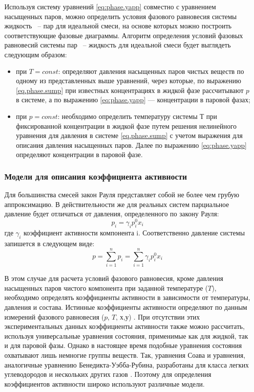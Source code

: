 Используя систему уравнений \eqref{eq:phase.yapp} совместно с уравнением насыщенных паров, можно определить условия фазового равновесия системы жидкость ~-- пар для идеальной смеси, на основе которых можно построить соответствующие фазовые диаграммы. 
Алгоритм определения условий фазовых равновесий системы пар ~-- жидкость для идеальной смеси будет выглядеть следующим образом:
\begin{itemize}
	\item при $T = const$: определяют давления насыщенных паров чистых веществ по одному из представленных выше уравнений, через которые, по выражению \eqref{eq.phase.sump} при известных концентрациях в жидкой фазе рассчитывают  $p$ в системе, а по выражению  \eqref{eq:phase.yapp} --- концентрации в паровой фазах;
	\item при $p = const$: необходимо определить температуру системы $Т$ при фиксированной концентрации в жидкой фазе путем решения нелинейного уравнения для давления в системе \eqref{eq.phase.sump} с учетом выражения для описания давления насыщенных паров. Далее по выражению \eqref{eq:phase.yapp} определяют концентрации в паровой фазе.
\end{itemize}

\subsubsection*{Модели для описания коэффициента активности}
Для большинства смесей закон Рауля представляет собой не более чем грубую аппроксимацию. В действительности же для реальных систем парциальное давление будет отличаться от давления, определенного по закону Рауля:
\begin{equation}
p_i=\gamma_i p_i^0 x_i
\end{equation}
где  $\gamma_i$ коэффициент активности компонента i. Соответственно давление системы запишется в следующем виде:
\begin{equation} \label{eq.phase.pressgam}
p=\sum\limits_{i=1}^{n} p_i=\sum\limits_{i=1}^{n} \gamma_i p_i^0 x_i
\end{equation}

В этом случае для расчета условий фазового равновесия, кроме давления насыщенных паров чистого компонента при заданной температуре ($T$), необходимо определять коэффициенты активности в зависимости от температуры, давления и состава.
Истинные коэффициенты активности определяют по данным измерений фазового равновесия ($p$, $T$, $х$,$ у$) \cite{kogan1,kogan2} . При отсутствии этих экспериментальных данных коэффициенты активности также можно рассчитать, используя универсальные уравнения состояния, применимые как для жидкой, так и для паровой фазы. Однако в настоящее время подобные уравнения состояния охватывают лишь немногие группы веществ. Так, уравнения Соава и уравнения, аналогичные уравнению Бенедикта-Уэбба-Рубина, разработаны для класса легких углеводородов и нескольких других газов \cite{rid1982}. Поэтому для определения коэффициентов активности широко используют различные модели.

